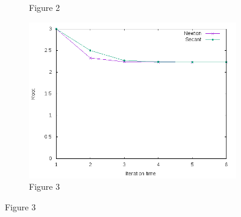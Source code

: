\documentclass{beamer}
\begin{document}
\begin{frame}
\begin{figure}[H]
\begin{subfigure}{0.3\linewidth}
  \caption{Figure 2}
  \label{fig:2}
  \end{subfigure}
  \begin{subfigure}{0.3\linewidth}
  \centering
  \includegraphics[width=1\textwidth]{graph3.png}
  \caption{Figure 3}
  \label{fig:3}
  \end{subfigure}
\end{figure}
\end{frame}
\end{document}
